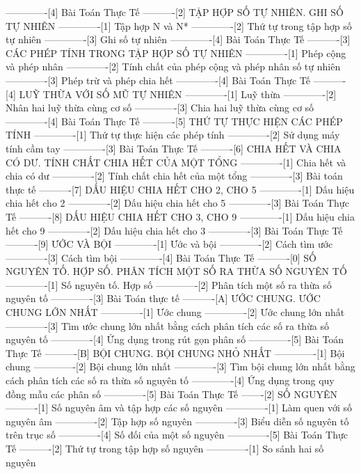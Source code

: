 -------------[4] Bài Toán Thực Tế
----------[2] TẬP HỢP SỐ TỰ NHIÊN. GHI SỐ TỰ NHIÊN
-------------[1] Tập hợp N và N*
-------------[2] Thứ tự trong tập hợp số tự nhiên
-------------[3] Ghi số tự nhiên
-------------[4] Bài Toán Thực Tế
----------[3] CÁC PHÉP TÍNH TRONG TẬP HỢP SỐ TỰ NHIÊN
-------------[1] Phép cộng và phép nhân
-------------[2] Tính chất của phép cộng và phép nhân số tự nhiên
-------------[3] Phép trừ và phép chia hết
-------------[4] Bài Toán Thực Tế
----------[4] LUỸ THỪA VỚI SỐ MŨ TỰ NHIÊN
-------------[1] Luỹ thừa
-------------[2] Nhân hai luỹ thừa cùng cơ số
-------------[3] Chia hai luỹ thừa cùng cơ số
-------------[4] Bài Toán Thực Tế
----------[5] THỨ TỰ THỰC HIỆN CÁC PHÉP TÍNH
-------------[1] Thứ tự thực hiện các phép tính
-------------[2] Sử dụng máy tính cầm tay
-------------[3] Bài Toán Thực Tế
----------[6] CHIA HẾT VÀ CHIA CÓ DƯ. TÍNH CHẤT CHIA HẾT CỦA MỘT TỔNG
-------------[1] Chia hết và chia có dư
-------------[2] Tính chất chia hết của một tổng
-------------[3] Bài toán thực tế
----------[7] DẤU HIỆU CHIA HẾT CHO 2, CHO 5
-------------[1] Dấu hiệu chia hết cho 2
-------------[2] Dấu hiệu chia hết cho 5
-------------[3] Bài Toán Thực Tế
----------[8] DẤU HIỆU CHIA HẾT CHO 3, CHO 9
-------------[1] Dấu hiệu chia hết cho 9
-------------[2] Dấu hiệu chia hết cho 3
-------------[3] Bài Toán Thực Tế
----------[9] ƯỚC VÀ BỘI
-------------[1] Ước và bội
-------------[2] Cách tìm ước
-------------[3] Cách tìm bội
-------------[4] Bài Toán Thực Tế
----------[0] SỐ NGUYÊN TỐ. HỢP SỐ. PHÂN TÍCH MỘT SỐ RA THỪA SỐ NGUYÊN TỐ
-------------[1] Số nguyên tố. Hợp số
-------------[2] Phân tích một số ra thừa số nguyên tố
-------------[3] Bài Toán thực tế
----------[A] ƯỚC CHUNG. ƯỚC CHUNG LỚN NHẤT
-------------[1] Ước chung
-------------[2] Ước chung lớn nhất
-------------[3] Tìm ước chung lớn nhất bằng cách phân tích các số ra thừa số nguyên tố
-------------[4] Ứng dụng trong rút gọn phân số
-------------[5] Bài Toán Thực Tế
----------[B] BỘI CHUNG. BỘI CHUNG NHỎ NHẤT
-------------[1] Bội chung
-------------[2] Bội chung lớn nhất
-------------[3] Tìm bội chung lớn nhất bằng cách phân tích các số ra thừa số nguyên tố
-------------[4] Ứng dụng trong quy đồng mẫu các phân số
-------------[5] Bài Toán Thực Tế
-------[2] SỐ NGUYÊN
----------[1] Số nguyên âm và tập hợp các số nguyên
-------------[1] Làm quen với số nguyên âm
-------------[2] Tập hợp số nguyên
-------------[3] Biểu diễn số nguyên tố trên trục số
-------------[4] Số đối của một số nguyên
-------------[5] Bài Toán Thực Tế
----------[2] Thứ tự trong tập hợp số nguyên
-------------[1] So sánh hai số nguyên
